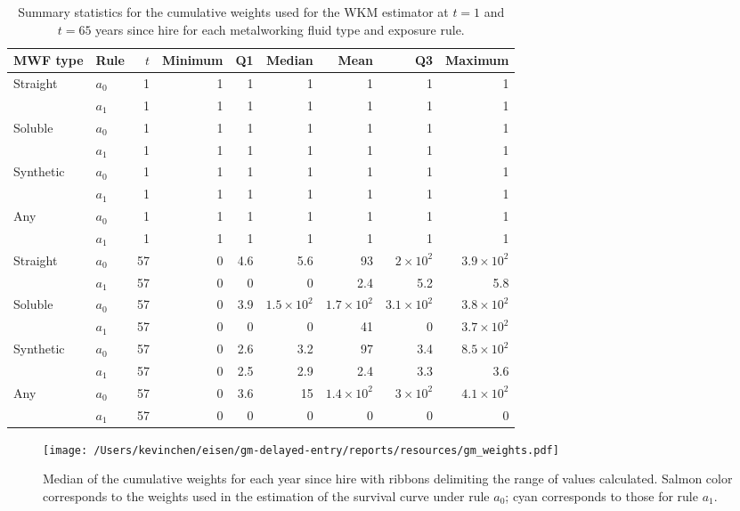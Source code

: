 \documentclass[
  11pt,
]{article}
\begin{document}
\begin{table}[H]
\centering
\caption{Summary statistics for the cumulative weights used for the WKM estimator at $t = 1$ and $t = 65$ years since hire for each metalworking fluid type and exposure rule.} 
\label{tab:gm_w}
\begin{tabular}{llrrrrrrr}
  \toprule
MWF type & Rule & $t$ & Minimum & Q1 & Median & Mean & Q3 & Maximum \\ 
  \midrule
Straight & $a_0$ &   1 &   1 &   1 &   1 &   1 &   1 &   1 \\ 
   & $a_1$ &   1 &   1 &   1 &   1 &   1 &   1 &   1 \\ 
  Soluble & $a_0$ &   1 &   1 &   1 &   1 &   1 &   1 &   1 \\ 
   & $a_1$ &   1 &   1 &   1 &   1 &   1 &   1 &   1 \\ 
  Synthetic & $a_0$ &   1 &   1 &   1 &   1 &   1 &   1 &   1 \\ 
   & $a_1$ &   1 &   1 &   1 &   1 &   1 &   1 &   1 \\ 
  Any & $a_0$ &   1 &   1 &   1 &   1 &   1 &   1 &   1 \\ 
   & $a_1$ &   1 &   1 &   1 &   1 &   1 &   1 &   1 \\ 
  Straight & $a_0$ &  57 &   0 & 4.6 & 5.6 &  93 & $2 \times 10^{2}$ & $3.9 \times 10^{2}$ \\ 
   & $a_1$ &  57 &   0 &   0 &   0 & 2.4 & 5.2 & 5.8 \\ 
  Soluble & $a_0$ &  57 &   0 & 3.9 & $1.5 \times 10^{2}$ & $1.7 \times 10^{2}$ & $3.1 \times 10^{2}$ & $3.8 \times 10^{2}$ \\ 
   & $a_1$ &  57 &   0 &   0 &   0 &  41 &   0 & $3.7 \times 10^{2}$ \\ 
  Synthetic & $a_0$ &  57 &   0 & 2.6 & 3.2 &  97 & 3.4 & $8.5 \times 10^{2}$ \\ 
   & $a_1$ &  57 &   0 & 2.5 & 2.9 & 2.4 & 3.3 & 3.6 \\ 
  Any & $a_0$ &  57 &   0 & 3.6 &  15 & $1.4 \times 10^{2}$ & $3 \times 10^{2}$ & $4.1 \times 10^{2}$ \\ 
   & $a_1$ &  57 &   0 &   0 &   0 &   0 &   0 &   0 \\ 
   \bottomrule
\end{tabular}
\end{table}

\begin{figure}
\caption{Median of the cumulative weights for each year since hire with ribbons delimiting the range of values calculated. Salmon color corresponds to the weights used in the estimation of the survival curve under rule $a_0$; cyan corresponds to those for rule $a_1$.}
\label{fig:gm_weights}
\begin{center}
\texttt{[image: /Users/kevinchen/eisen/gm-delayed-entry/reports/resources/gm\_weights.pdf]}
\end{center}
\end{figure}
\end{document}
